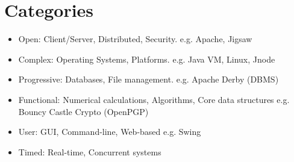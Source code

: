 \section{Categories}\label{sec:categories}

\begin{itemize}
\item Open: Client/Server, Distributed, Security. e.g. Apache, Jigsaw
\item Complex: Operating Systems,  Platforms. e.g. Java VM, Linux, Jnode
\item Progressive: Databases, File management. e.g. Apache Derby (DBMS)
\item Functional: Numerical calculations, Algorithms, Core data structures e.g. Bouncy Castle Crypto (OpenPGP)
\item User: GUI, Command-line, Web-based e.g. Swing
\item Timed: Real-time, Concurrent systems 
\end{itemize}
